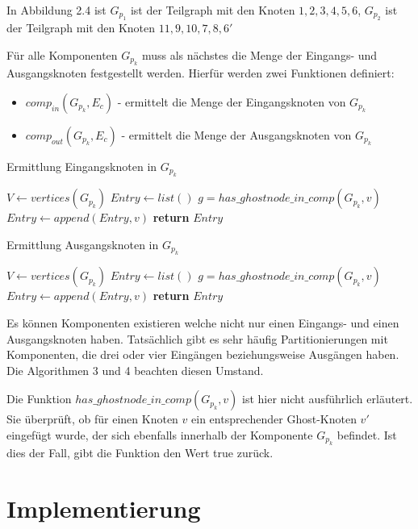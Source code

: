 \begin{bem}
  In Abbildung 2.4 ist $G_{p_1}$ ist der Teilgraph mit den Knoten $1,2,3,4,5,6$, $G_{p_2}$ ist der Teilgraph
  mit den Knoten
  $11,9,10,7,8,6'$
\end{bem}
Für alle Komponenten $G_{p_k}$ muss als nächstes die Menge der Eingangs- und
Ausgangsknoten festgestellt werden. Hierfür werden zwei Funktionen
definiert:
\begin{itemize}
  \item $comp_{in}(G_{p_k}, E_c)$ - ermittelt die Menge der
    Eingangsknoten von $G_{p_k}$ 
  \item $comp_{out}(G_{p_k}, E_c)$ - ermittelt die Menge der
    Ausgangsknoten von $G_{p_k}$ 
\end{itemize}
\newpage
\begin{algorithm}
  \caption{Ermittlung Eingangsknoten in $G_{p_k}$}\label{alg:comp_in}
\begin{algorithmic}[1]
    \State $V \gets vertices(G_{p_k})$
    \State $Entry \gets list()$
      \State $g = has\_ghostnode\_in\_comp(G_{p_k}, v)$
        \State $Entry \gets append(Entry, v)$
      \EndIf
    \EndForeach
    \State \textbf{return} $Entry$
  \EndProcedure
\end{algorithmic}
\end{algorithm}
\begin{algorithm}
\caption{Ermittlung Ausgangsknoten in $G_{p_k}$}\label{alg:comp_out}
\begin{algorithmic}[1]
    \State $V \gets vertices(G_{p_k})$
    \State $Entry \gets list()$
      \State $g = has\_ghostnode\_in\_comp(G_{p_k}, v)$
        \State $Entry \gets append(Entry, v)$
      \EndIf
    \EndForeach
    \State \textbf{return} $Entry$
  \EndProcedure
\end{algorithmic}
\end{algorithm}
\begin{bem}
  Es können Komponenten existieren welche nicht nur einen Eingangs- und
  einen Ausgangsknoten haben. Tatsächlich gibt es sehr häufig
  Partitionierungen mit Komponenten, die drei oder vier Eingängen
  beziehungsweise Ausgängen haben. Die Algorithmen 3 und 4 beachten
  diesen Umstand.
\end{bem}
\begin{bem}
  Die Funktion $has\_ghostnode\_in\_comp(G_{p_k}, v)$ ist hier nicht
  ausführlich erläutert. Sie überprüft, ob für einen Knoten $v$ ein
  entsprechender Ghost-Knoten $v'$ eingefügt wurde, der sich ebenfalls
  innerhalb der Komponente $G_{p_k}$ befindet. Ist dies der Fall, gibt
  die Funktion den Wert true zurück. 
\end{bem}
\newpage
\section{Implementierung}
